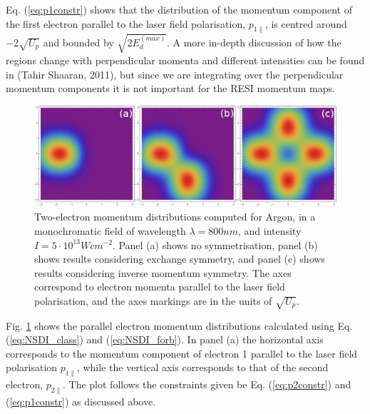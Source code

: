 \documentclass[11pt]{article}
\numberwithin{equation}{section}
\begin{document}
Eq. (\ref{eq:p1constr}) shows that the distribution of the momentum component of the first electron parallel to the laser field polarisation, $p_{1\parallel}$, is centred around $-2\sqrt{U_p}$ and bounded by $\sqrt{2E_d^{(max)}}$. A more in-depth discussion of how the regions change with perpendicular momenta and different intensities can be found in (Tahir Shaaran, 2011)\cite{shaaran_2010_laserinduced}, but since we are integrating over the perpendicular momentum components it is not important for the RESI momentum maps. 
\begin{figure}[!htb]
    \centering
    \includegraphics[width = 14cm]{Figures/NSDI_combined_800_5e13.png}
    \caption{Two-electron momentum distributions computed for Argon, in a monochromatic field of wavelength $\lambda = 800nm$, and intensity $I = 5\cdot 10^{13} Wcm^{-2}$. Panel (a) shows no symmetrisation, panel (b) shows results considering exchange symmetry, and panel (c) shows results considering inverse momentum symmetry. The axes correspond to electron momenta parallel to the laser field polarisation, and the axes markings are in the units of $\sqrt{U_p}$.}
    \label{fig:NSID_res}
\end{figure}
Fig. \ref{fig:NSID_res} shows the parallel electron momentum distributions calculated using Eq. (\ref{eq:NSDI_class}) and (\ref{eq:NSDI_forb}). In panel (a) the horizontal axis corresponds to the momentum component of electron 1 parallel to the laser field polarisation $p_{1\parallel}$, while the vertical axis corresponds to that of the second electron, $p_{2\parallel}$. The plot follows the constraints given be Eq. (\ref{eq:p2constr}) and (\ref{eq:p1constr}) as discussed above. 
\par
\end{document}
